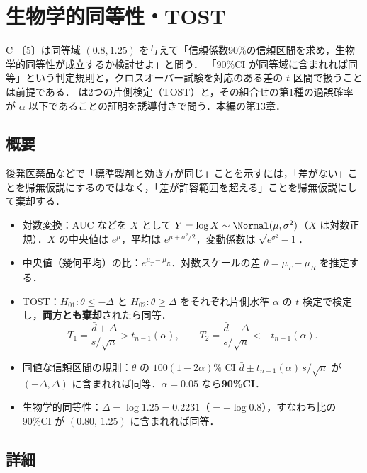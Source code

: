 \chapter{生物学的同等性・TOST}\label{ch:m10}

\begin{priobox}{C}
〔5〕は同等域 $(0.8,1.25)$ を与えて「信頼係数90\%の信頼区間を求め，生物学的同等性が成立するか検討せよ」と問う．
「90\%CI が同等域に含まれれば同等」という判定規則と，クロスオーバー試験を対応のある差の $t$ 区間で扱うことは前提である．
は2つの片側検定（TOST）と，その組合せの第1種の過誤確率が $\alpha$ 以下であることの証明を誘導付きで問う．本編の第13章．
\end{priobox}

\section{概要}\label{sec:m10-gaiyo}
後発医薬品などで「標準製剤と効き方が同じ」ことを示すには，「差がない」ことを帰無仮説にするのではなく，「差が許容範囲を超える」ことを帰無仮説にして棄却する．
\begin{pointbox}[覚える式]
\begin{itemize}
\item 対数変換：AUC などを $X$ として $Y=\log X\sim\Normal(\mu,\sigma^2)$（$X$ は対数正規）．$X$ の中央値は $e^\mu$，平均は $e^{\mu+\sigma^2/2}$，変動係数は $\sqrt{e^{\sigma^2}-1}$．
\item 中央値（幾何平均）の比：$e^{\mu_T-\mu_R}$．対数スケールの差 $\theta=\mu_T-\mu_R$ を推定する．
\item TOST：$H_{01}:\theta\le-\Delta$ と $H_{02}:\theta\ge\Delta$ をそれぞれ片側水準 $\alpha$ の $t$ 検定で検定し，\textbf{両方とも棄却}されたら同等．
      \[T_1=\frac{\bar d+\Delta}{s/\sqrt n}>t_{n-1}(\alpha),\qquad T_2=\frac{\bar d-\Delta}{s/\sqrt n}<-t_{n-1}(\alpha).\]
\item 同値な信頼区間の規則：$\theta$ の $100(1-2\alpha)\%$ CI $\bar d\pm t_{n-1}(\alpha)\,s/\sqrt n$ が $(-\Delta,\Delta)$ に含まれれば同等．$\alpha=0.05$ なら\textbf{90\%CI}．
\item 生物学的同等性：$\Delta=\log1.25=0.2231$（$=-\log0.8$），すなわち比の90\%CI が $(0.80,\,1.25)$ に含まれれば同等．
\end{itemize}
\end{pointbox}

\section{詳細}\label{sec:m10-shosai}
